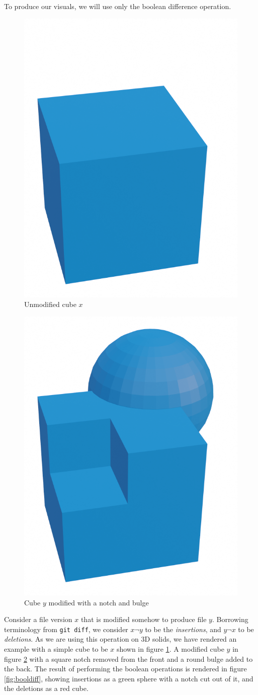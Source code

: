 \documentclass[sigconf,authorversion,nonacm]{acmart}
\begin{document}
To produce our visuals, we will use only the boolean difference operation.

\begin{figure}[h]
	\includegraphics[width=0.5\linewidth]{cube-before.png}
	\caption{Unmodified cube $x$}
	\label{fig:cubex}
\end{figure}

\begin{figure}[h]
	\includegraphics[width=0.5\linewidth]{cube-after.png}
	\caption{Cube $y$ modified with a notch and bulge}
	\label{fig:cubey}
\end{figure}

Consider a file version $x$ that is modified somehow to produce file $y$.
Borrowing terminology from \texttt{git diff}, we consider $x \neg y$ to be the \emph{insertions}, and $y \neg x$ to be \emph{deletions}.
As we are using this operation on 3D solids, we have rendered an example with a simple cube to be $x$ shown in figure \ref{fig:cubex}.
A modified cube $y$ in figure \ref{fig:cubey} with a square notch removed from the front and a round bulge added to the back.
The result of performing the boolean operations is rendered in figure \ref{fig:booldiff}, showing insertions as a green sphere with a notch cut out of it, and the deletions as a red cube.
\end{document}

